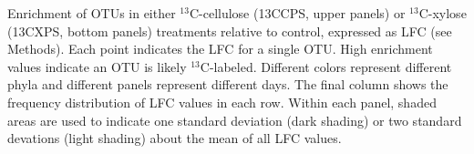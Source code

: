 Enrichment of OTUs in either $^{13}$C-cellulose (13CCPS, upper panels) or $^{13}$C-xylose (13CXPS, bottom panels) 
treatments relative to control, expressed as LFC (see Methods). Each point indicates the LFC for a single OTU. High
enrichment values indicate an OTU is likely $^{13}$C-labeled. Different colors
represent different phyla and different panels represent different days. The
final column shows the frequency distribution of LFC values in each row. Within
each panel, shaded areas are used to indicate one standard
deviation (dark shading) or two standard devations (light shading) about the
mean of all LFC values.
